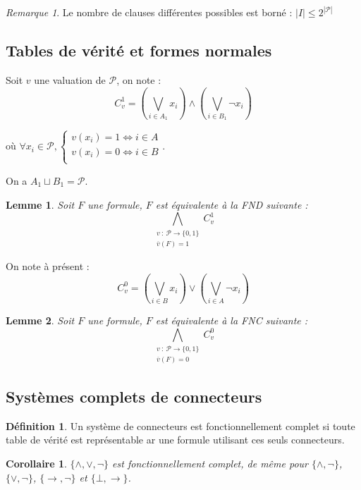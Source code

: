 \documentclass[]{article}
\newtheorem{mylemma}{Lemme}
\newtheorem{mycor}{Corollaire}
\theoremstyle{remark}
\newtheorem{myrem}{Remarque}
\theoremstyle{definition}
\newtheorem{mydef}{Définition}
\newcommand{\funcshort}[3]{
#1 ~ : ~ #2 \longrightarrow #3
}
\begin{document}
\begin{myrem}
	Le nombre de clauses différentes possibles est borné : $|I| \leqslant 2^{|\mathcal{P}|}$
\end{myrem}

\subsection{Tables de vérité et formes normales}

Soit $v$ une valuation de $\mathcal{P}$, on note : $$C_v^1 = \left(\bigvee_{i \in A_1} x_i\right) \land \left(\bigvee_{i \in B_1} \neg x_i\right)$$

où $\forall x_i \in \mathcal{P}, \left\{
\begin{array}{l}
	v(x_i) = 1 \Longleftrightarrow i \in A \\
	v(x_i) = 0 \Longleftrightarrow i \in B \\
\end{array}
\right.$.

On a $A_1 \sqcup B_1 = \mathcal{P}$.

\begin{mylemma}
	Soit $F$ une formule, $F$ est équivalente à la FND suivante : $$\bigwedge\limits_{\substack{\funcshort{v}{\mathcal{P}}{\{0, 1\} \\ \overline{v}(F) = 1}}} C_v^1$$
\end{mylemma}

On note à présent : $$C_v^0 = \left(\bigvee_{i \in B} x_i\right) \lor \left(\bigvee_{i \in A} \neg x_i\right)$$

\begin{mylemma}
	Soit $F$ une formule, $F$ est équivalente à la FNC suivante : $$\bigwedge\limits_{\substack{\funcshort{v}{\mathcal{P}}{\{0, 1\} \\ \overline{v}(F) = 0}}} C_v^0$$
\end{mylemma}

\subsection{Systèmes complets de connecteurs}

\begin{mydef}
	Un système de connecteurs est fonctionnellement complet si toute table de vérité est représentable ar une formule utilisant ces seuls connecteurs.
\end{mydef}

\begin{mycor}
	$\{\land, \lor, \neg\}$ est fonctionnellement complet, de même pour $\{\land, \neg\}$, $\{\lor, \neg\}$, $\{\rightarrow, \neg\}$ et $\{\bot, \rightarrow\}$.
\end{mycor}
\end{document}
